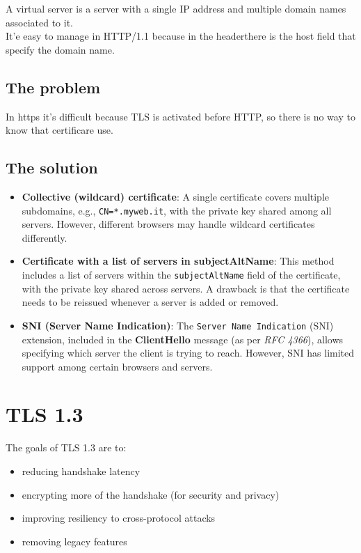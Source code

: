 A virtual server is a server with a single IP address and multiple domain names associated to it. \\
It'e easy to manage in HTTP/1.1 because in the headerthere is the host field that specify the domain name. \\

\subsection{The problem}
In https it's difficult because TLS is activated before HTTP, so there is no way to know that certificare use.

\subsection{The solution}

\begin{itemize}
    \item \textbf{Collective (wildcard) certificate}: A single certificate covers multiple subdomains, e.g., \texttt{CN=*.myweb.it}, with the private key shared among all servers. However, different browsers may handle wildcard certificates differently.
    
    \item \textbf{Certificate with a list of servers in subjectAltName}: This method includes a list of servers within the \texttt{subjectAltName} field of the certificate, with the private key shared across servers. A drawback is that the certificate needs to be reissued whenever a server is added or removed.
    
    \item \textbf{SNI (Server Name Indication)}: The \texttt{Server Name Indication} (SNI) extension, included in the \textbf{ClientHello} message (as per \textit{RFC 4366}), allows specifying which server the client is trying to reach. However, SNI has limited support among certain browsers and servers.
\end{itemize}

\section{TLS 1.3}

The goals of TLS 1.3 are to:
\begin{itemize}[itemsep=0pt]
    \item reducing handshake latency
    \item encrypting more of the handshake (for security and privacy)
    \item improving resiliency to cross-protocol attacks
    \item removing legacy features
\end{itemize}

